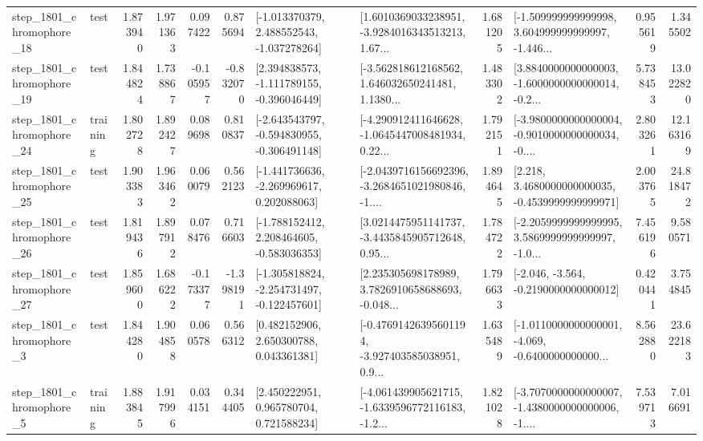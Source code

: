 \begin{tabular}{llrrrrllrlrr}
 step\_1801\_chromophore\_18 &      test &      1.873940 &    1.971363 &      0.097422 &  0.875694 &   [-1.013370379, 2.488552543, -1.037278264] &  [1.6010369033238951, -3.9284016343513213, 1.67... &       1.681205 &  [-1.509999999999998, 3.604999999999997, -1.446... &            0.955619 &          1.345502 \\
 step\_1801\_chromophore\_19 &      test &      1.844824 &    1.738867 &     -0.105957 & -0.832070 &   [2.394838573, -1.111789155, -0.396046449] &  [-3.562818612168562, 1.646032650241481, 1.1380... &       1.483302 &  [3.8840000000000003, -1.6000000000000014, -0.2... &            5.738453 &         13.022820 \\
 step\_1801\_chromophore\_24 &  training &      1.802728 &    1.892427 &      0.089698 &  0.810837 &  [-2.643543797, -0.594830955, -0.306491148] &  [-4.290912411646628, -1.0645447008481934, 0.22... &       1.792151 &  [-3.9800000000000004, -0.9010000000000034, -0.... &            2.803261 &         12.163169 \\
 step\_1801\_chromophore\_25 &      test &      1.903383 &    1.963462 &      0.060079 &  0.562123 &   [-1.441736636, -2.269969617, 0.202088063] &  [-2.0439716156692396, -3.2684651021980846, -1.... &       1.894645 &   [2.218, 3.4680000000000035, -0.4539999999999971] &            2.003765 &         24.818472 \\
 step\_1801\_chromophore\_26 &      test &      1.819436 &    1.897912 &      0.078476 &  0.716603 &   [-1.788152412, 2.208464605, -0.583036353] &  [3.0214475951141737, -3.4435845905712648, 0.95... &       1.784722 &  [-2.2059999999999995, 3.5869999999999997, -1.0... &            7.456196 &          9.580571 \\
 step\_1801\_chromophore\_27 &      test &      1.859600 &    1.686222 &     -0.173377 & -1.398191 &  [-1.305818824, -2.254731497, -0.122457601] &  [2.235305698178989, 3.7826910658688693, -0.048... &       1.796633 &              [-2.046, -3.564, -0.2190000000000012] &            0.420441 &          3.754845 \\
  step\_1801\_chromophore\_3 &      test &      1.844280 &    1.904858 &      0.060578 &  0.566312 &     [0.482152906, 2.650300788, 0.043361381] &  [-0.47691426395601194, -3.927403585038951, 0.9... &       1.635489 &  [-1.0110000000000001, -4.069, -0.6400000000000... &            8.562880 &         23.622183 \\
  step\_1801\_chromophore\_5 &  training &      1.883845 &    1.917996 &      0.034151 &  0.344405 &     [2.450222951, 0.965780704, 0.721588234] &  [-4.061439905621715, -1.6339596772116183, -1.2... &       1.821028 &  [-3.7070000000000007, -1.4380000000000006, -1.... &            7.539713 &          7.016691 \\

\end{tabular}

